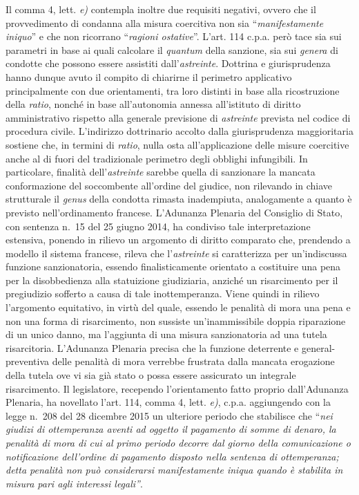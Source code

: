 \documentclass[12pt,it,a4paper,]{report}
\begin{document}
Il comma 4, lett. \emph{e)} contempla inoltre due requisiti negativi,
ovvero che il provvedimento di condanna alla misura coercitiva non sia
``\emph{manifestamente iniquo}'' e che non ricorrano ``\emph{ragioni
ostative}''. L'art. 114 c.p.a. però tace sia sui parametri in base ai
quali calcolare il \emph{quantum} della sanzione, sia sui \emph{genera}
di condotte che possono essere assistiti dall'\emph{astreinte}. Dottrina
e giurisprudenza hanno dunque avuto il compito di chiarirne il perimetro
applicativo principalmente con due orientamenti, tra loro distinti in
base alla ricostruzione della \emph{ratio}, nonché in base all'autonomia
annessa all'istituto di diritto amministrativo rispetto alla generale
previsione di \emph{astreinte} prevista nel codice di procedura civile.
L'indirizzo dottrinario accolto dalla giurisprudenza maggioritaria
sostiene che, in termini di \emph{ratio}, nulla osta all'applicazione
delle misure coercitive anche al di fuori del tradizionale perimetro
degli obblighi infungibili. In particolare, finalità
dell'\emph{astreinte} sarebbe quella di sanzionare la mancata
conformazione del soccombente all'ordine del giudice, non rilevando in
chiave strutturale il \emph{genus} della condotta rimasta inadempiuta,
analogamente a quanto è previsto nell'ordinamento francese. L'Adunanza
Plenaria del Consiglio di Stato, con sentenza n.~15 del 25 giugno 2014,
ha condiviso tale interpretazione estensiva, ponendo in rilievo un
argomento di diritto comparato che, prendendo a modello il sistema
francese, rileva che l'\emph{astreinte} si caratterizza per
un'indiscussa funzione sanzionatoria, essendo finalisticamente orientato
a costituire una pena per la disobbedienza alla statuizione giudiziaria,
anziché un risarcimento per il pregiudizio sofferto a causa di tale
inottemperanza. Viene quindi in rilievo l'argomento equitativo, in virtù
del quale, essendo le penalità di mora una pena e non una forma di
risarcimento, non sussiste un'inammissibile doppia riparazione di un
unico danno, ma l'aggiunta di una misura sanzionatoria ad una tutela
risarcitoria. L'Adunanza Plenaria precisa che la funzione deterrente e
general-preventiva delle penalità di mora verrebbe frustrata dalla
mancata erogazione della tutela ove vi sia già stato o possa essere
assicurato un integrale risarcimento. Il legislatore, recependo
l'orientamento fatto proprio dall'Adunanza Plenaria, ha novellato l'art.
114, comma 4, lett. \emph{e)}, c.p.a. aggiungendo con la legge n.~208
del 28 dicembre 2015 un ulteriore periodo che stabilisce che ``\emph{nei
giudizi di ottemperanza aventi ad oggetto il pagamento di somme di
denaro, la penalità di mora di cui al primo periodo decorre dal giorno
della comunicazione o notificazione dell'ordine di pagamento disposto
nella sentenza di ottemperanza; detta penalità non può considerarsi
manifestamente iniqua quando è stabilita in misura pari agli interessi
legali''}.
\end{document}
